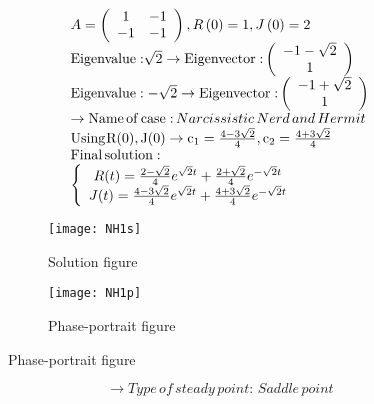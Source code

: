\documentclass[a4paper]{article}
\begin{document}
\[\begin{array}{l}
A = \left( {\begin{array}{*{20}{c}}
1&{ - 1}\\
{ - 1}&{ - 1}
\end{array}} \right),R\left( 0 \right) = 1,J\left( 0 \right) = 2\\
{\rm{Eigenvalue:}}\sqrt 2  \to {\rm{Eigenvector:}}\left( {\begin{array}{*{20}{c}}
{ - 1 - \sqrt 2 }\\
1
\end{array}} \right)\\
{\rm{Eigenvalue: - }}\sqrt 2  \to {\rm{Eigenvector:}}\left( {\begin{array}{*{20}{c}}
{ - 1 + \sqrt 2 }\\
1
\end{array}} \right)\\
 \to {\rm{Name}}\,{\rm{of}}\,{\rm{case:}}\,Narcissistic\,Nerd\,and\,Hermit\\
{\rm{Using}}{\mkern 1mu} {\rm{R}}({\rm{0}}),{\rm{J}}({\rm{0}}) \to {{\rm{c}}_1} = \frac{{4 - 3\sqrt 2 }}{4},{{\rm{c}}_2} = \frac{{4 + 3\sqrt 2 }}{4}\\
{\rm{Final}}\,{\rm{solution:}}\\
\left\{ {\begin{array}{*{20}{c}}
{R(t) = \frac{{2 - \sqrt 2 }}{4}{e^{\sqrt 2 t}} + \frac{{2 + \sqrt 2 }}{4}{e^{ - \sqrt 2 t}}}\\
{J(t) = \frac{{4 - 3\sqrt 2 }}{4}{e^{\sqrt 2 t}} + \frac{{4 + 3\sqrt 2 }}{4}{e^{ - \sqrt 2 t}}}
\end{array}} \right.
\end{array}\]
\begin{figure}[H]
\centering
\begin{subfigure}{.5\textwidth}
  \centering
  \texttt{[image: NH1s]}
  \caption*{Solution figure}
\end{subfigure}%
\begin{subfigure}{.5\textwidth}
  \centering
  \texttt{[image: NH1p]}
  \caption*{Phase-portrait figure}
\end{subfigure}
\end{figure}
\[  \to  Type\,of\,steady\,point:\,Saddle\,point\]
\end{document}
